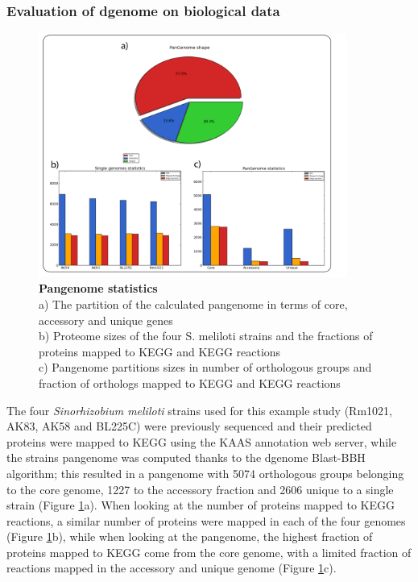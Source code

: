 \subsubsection{Evaluation of dgenome on biological data}
\begin{figure}[!tb]
	\center
    \includegraphics[width=0.9\textwidth]{figures/2/thesis_22}
	\caption{\label{fig:dgenome}\textbf{Pangenome statistics}\\
			a) The partition of the calculated pangenome in terms of core, accessory and unique genes\\
			b) Proteome sizes of the four S. meliloti strains and the fractions of proteins mapped to KEGG and KEGG reactions\\
			c) Pangenome partitions sizes in number of orthologous groups and fraction of orthologs mapped to KEGG and KEGG reactions}
\end{figure}

The four \textit{Sinorhizobium meliloti} strains used for this example study (Rm1021, AK83, AK58 and BL225C) were previously sequenced \cite{galibert2001composite}\cite{galardini2011exploring} and their predicted proteins were mapped to KEGG using the KAAS annotation web server, while the strains pangenome was computed thanks to the dgenome Blast-BBH algorithm; this resulted in a pangenome with 5074 orthologous groups belonging to the core genome, 1227 to the accessory fraction and 2606 unique to a single strain (Figure \ref{fig:dgenome}a). When looking at the number of proteins mapped to KEGG reactions, a similar number of proteins were mapped in each of the four genomes (Figure \ref{fig:dgenome}b), while when looking at the pangenome, the highest fraction of proteins mapped to KEGG come from the core genome, with a limited fraction of reactions mapped in the accessory and unique genome (Figure \ref{fig:dgenome}c).

